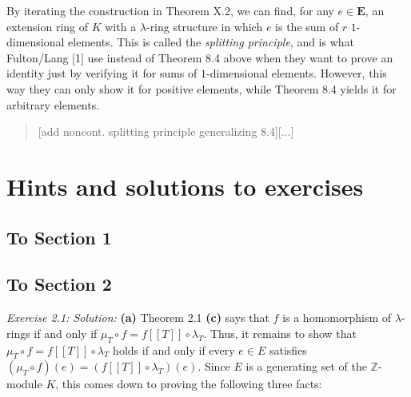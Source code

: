 \documentclass[numbers=enddot,12pt,final,onecolumn,notitlepage]{scrartcl}%
\begin{document}
By iterating the construction in Theorem X.2, we can find, for any
$e\in\mathbf{E}$, an extension ring of $K$ with a $\lambda$-ring structure in
which $e$ is the sum of $r$ $1$-dimensional elements. This is called the
\textit{splitting principle}, and is what Fulton/Lang [1] use instead of
Theorem 8.4 above when they want to prove an identity just by verifying it for
sums of $1$-dimensional elements. However, this way they can only show it for
positive elements, while Theorem 8.4 yields it for arbitrary elements.

\begin{quote}
[add noncont. splitting principle generalizing 8.4][...]
\end{quote}

\section{Hints and solutions to exercises}

\subsection{To Section 1}

\subsection{To Section 2}

\textit{Exercise 2.1: Solution:} \textbf{(a)} Theorem 2.1 \textbf{(c)} says
that $f$ is a homomorphism of $\lambda$-rings if and only if $\mu_{T}\circ
f=f\left[  \left[  T\right]  \right]  \circ\lambda_{T}$. Thus, it remains to
show that $\mu_{T}\circ f=f\left[  \left[  T\right]  \right]  \circ\lambda
_{T}$ holds if and only if every $e\in E$ satisfies $\left(  \mu_{T}\circ
f\right)  \left(  e\right)  =\left(  f\left[  \left[  T\right]  \right]
\circ\lambda_{T}\right)  \left(  e\right)  $. Since $E$ is a generating set of
the $\mathbb{Z}$-module $K$, this comes down to proving the following three facts:
\end{document}
